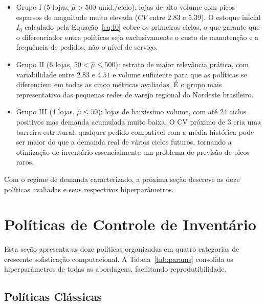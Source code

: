 \documentclass[a4paper,11pt]{article}
\begin{document}
\begin{itemize}
  \item Grupo I (5 lojas, $\hat{\mu} > 500$ unid./ciclo):
    lojas de alto volume com picos esparsos de magnitude muito
    elevada ($CV$ entre $2.83$ e $5.39$). O estoque inicial $I_0$
    calculado pela Equação~\eqref{eq:I0} cobre os primeiros ciclos,
    o que garante que o diferenciador entre políticas seja
    exclusivamente o custo de manutenção e a frequência de pedidos,
    não o nível de serviço.
  \item Grupo II (6 lojas, $50 < \hat{\mu} \leq 500$):
    estrato de maior relevância prática, com variabilidade entre
    $2.83$ e $4.51$ e volume suficiente para que as políticas se
    diferenciem em todas as cinco métricas avaliadas. É o grupo
    mais representativo das pequenas redes de varejo regional
    do Nordeste brasileiro.
  \item Grupo III (4 lojas, $\hat{\mu} \leq 50$):
    lojas de baixíssimo volume, com até 24 ciclos positivos mas
    demanda acumulada muito baixa. O CV próximo de 3 cria uma barreira
    estrutural: qualquer pedido compatível com a média histórica
    pode ser maior do que a demanda real de vários ciclos futuros,
    tornando a otimização de inventário essencialmente um problema
    de previsão de picos raros.
\end{itemize}

Com o regime de demanda caracterizado, a próxima seção descreve as
doze políticas avaliadas e seus respectivos hiperparâmetros.

\section{Políticas de Controle de Inventário}

Esta seção apresenta as doze políticas organizadas em quatro
categorias de crescente sofisticação computacional. A
Tabela~\ref{tab:params} consolida os hiperparâmetros de todas as
abordagens, facilitando reprodutibilidade.

\subsection{Políticas Clássicas}
\end{document}
